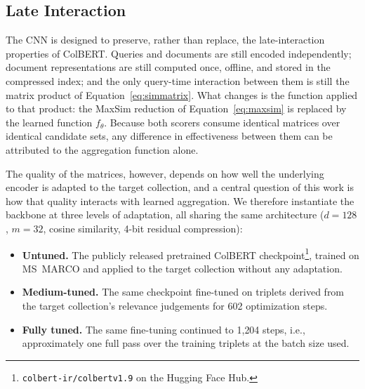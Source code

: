 \documentclass[preprint,5p,times,twocolumn,authoryear]{elsarticle}
\begin{document}
\subsection{Late Interaction}
\label{sec:li}

The CNN is designed to preserve, rather than replace, the late-interaction properties of ColBERT. Queries and documents are still encoded independently; document representations are still computed once, offline, and stored in the compressed index; and the only query-time interaction between them is still the matrix product of Equation~\eqref{eq:simmatrix}. What changes is the function applied to that product: the MaxSim reduction of Equation~\eqref{eq:maxsim} is replaced by the learned function $f_\theta$. Because both scorers consume identical matrices over identical candidate sets, any difference in effectiveness between them can be attributed to the aggregation function alone.

The quality of the matrices, however, depends on how well the underlying encoder is adapted to the target collection, and a central question of this work is how that quality interacts with learned aggregation. We therefore instantiate the backbone at three levels of adaptation, all sharing the same architecture ($d=128$, $m=32$, cosine similarity, 4-bit residual compression):

\begin{itemize}
    \item \textbf{Untuned.} The publicly released pretrained ColBERT checkpoint\footnote{\texttt{colbert-ir/colbertv1.9} on the Hugging Face Hub.}, trained on MS~MARCO \citep{msmarco} and applied to the target collection without any adaptation.
    \item \textbf{Medium-tuned.} The same checkpoint fine-tuned on triplets derived from the target collection's relevance judgements for 602 optimization steps.
    \item \textbf{Fully tuned.} The same fine-tuning continued to 1{,}204 steps, i.e., approximately one full pass over the training triplets at the batch size used.
\end{itemize}
\end{document}
